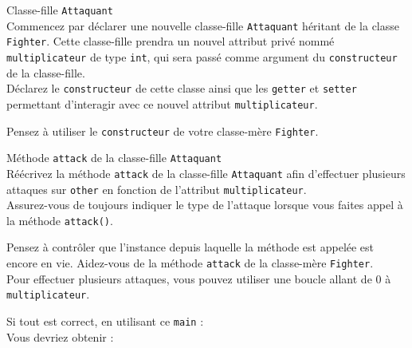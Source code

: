 \begin{Exercice}[5 minutes] Classe-fille \lstinline{Attaquant} \\

Commencez par déclarer une nouvelle classe-fille \lstinline{Attaquant} héritant de la classe \lstinline{Fighter}. Cette classe-fille prendra un nouvel attribut privé nommé \lstinline{multiplicateur} de type \lstinline{int}, qui sera passé comme argument du \lstinline{constructeur} de la classe-fille. \\

Déclarez le \lstinline{constructeur} de cette classe ainsi que les \lstinline{getter} et \lstinline{setter} permettant d'interagir avec ce nouvel attribut \lstinline{multiplicateur}. \\

\begin{conseil}
Pensez à utiliser le \lstinline{constructeur} de votre classe-mère \lstinline{Fighter}.
\end{conseil}

\begin{solution}
	
\end{solution}

\end{Exercice}

\begin{Exercice}[10 minutes] Méthode \lstinline{attack} de la classe-fille \lstinline{Attaquant} \\

Réécrivez la méthode \lstinline{attack} de la classe-fille \lstinline{Attaquant} afin d'effectuer plusieurs attaques sur \lstinline{other} en fonction de l'attribut \lstinline{multiplicateur}. \\

Assurez-vous de toujours indiquer le type de l'attaque lorsque vous faites appel à la méthode \lstinline{attack()}.

\begin{conseil}
Pensez à contrôler que l'instance depuis laquelle la méthode est appelée est encore en vie.
Aidez-vous de la méthode \lstinline{attack} de la classe-mère \lstinline{Fighter}.\\

Pour effectuer plusieurs attaques, vous pouvez utiliser une boucle allant de 0 à \lstinline{multiplicateur}.

\end{conseil}

\begin{solution}
	
\end{solution}

\end{Exercice}

Si tout est correct, en utilisant ce \lstinline{main} : \\

 

Vous devriez obtenir : \\

 



